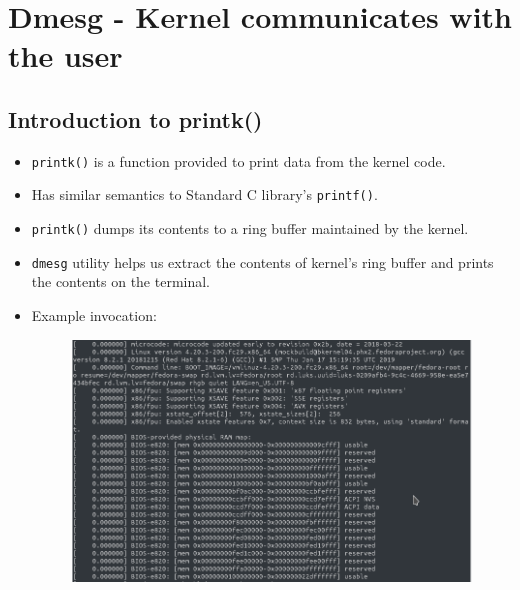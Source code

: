 \documentclass{beamer}
\begin{document}
\section{Dmesg - Kernel communicates with the user}

\subsection{Introduction to printk()}

\begin{frame}
  \begin{itemize}
  \item \texttt{printk()} is a function provided to print data from the kernel
    code.
  \item Has similar semantics to Standard C library's \texttt{printf()}.

  \item \texttt{printk()} dumps its contents to a ring buffer maintained by
    the kernel.
  \end{itemize}
\end{frame}

\begin{frame}
  \begin{itemize}
  \item \texttt{dmesg} utility helps us extract the contents of kernel's ring
    buffer and prints the contents on the terminal.
  \item Example invocation:
    \begin{figure}[h!]
      \centering
      \includegraphics[scale=0.3]{images/dmesg-0.png}
    \end{figure}
  \end{itemize}
\end{frame}
\end{document}
